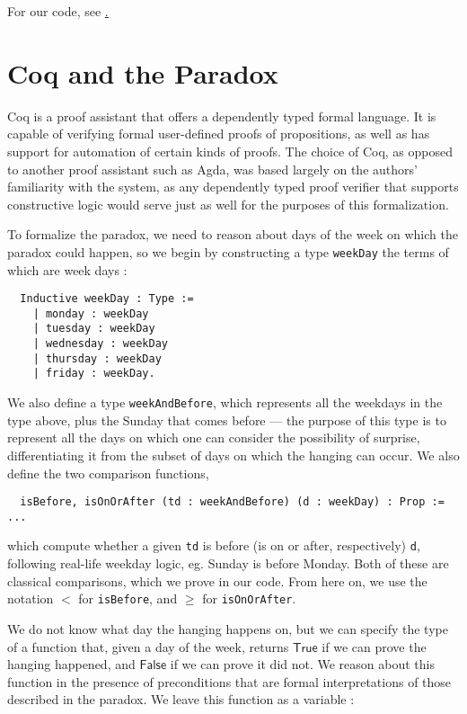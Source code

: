 \documentclass[journal]{journal}
\begin{document}
  For our code, see \href{https://github.com/polinavino/unexpected_hanging/blob/master/unexpected_hanging.v}.

\section{Coq and the Paradox}
\label{sec:form}

Coq is a proof assistant that offers a dependently typed formal language.
It is capable of verifying formal user-defined proofs of propositions, as well as has support
for automation of certain kinds of proofs. The choice of Coq, as opposed to another
proof assistant such as Agda, was based largely on the authors' familiarity with the system,
as any dependently typed proof verifier that supports constructive logic
would serve just as well for the purposes of this formalization.

To formalize the paradox, we need to reason about days of the week on which
the paradox could happen, so we
begin by constructing a type {\tt weekDay} the terms of which are week days :

\begin{lstlisting}
  Inductive weekDay : Type :=
    | monday : weekDay
    | tuesday : weekDay
    | wednesday : weekDay
    | thursday : weekDay
    | friday : weekDay.
\end{lstlisting}

We also define a type {\tt weekAndBefore}, which represents all the weekdays in
the type above, plus the Sunday that comes before --- the purpose of this type is to
represent all the days on which one can consider the possibility of surprise,
differentiating it from the subset of days on which the hanging can occur. We
also define the two comparison functions,

\begin{lstlisting}
  isBefore, isOnOrAfter (td : weekAndBefore) (d : weekDay) : Prop := ...
\end{lstlisting}

which compute whether a given {\tt td} is before (is on or after, respectively) {\tt d},
following real-life weekday logic, eg. Sunday is before Monday.
Both of these are classical comparisons, which we prove in our code.
From here on, we use the notation $<$ for {\tt isBefore}, and
$\geq$ for {\tt isOnOrAfter}.

We do not know what day the hanging happens on, but we can specify the type of a
function that, given a day of the week, returns $\mathsf{True}$ if we can prove the hanging
happened, and $\mathsf{False}$ if we can prove it did not. We reason about this function
in the presence of preconditions that are formal interpretations of those described
in the paradox. We leave this function as a variable :
\end{document}

